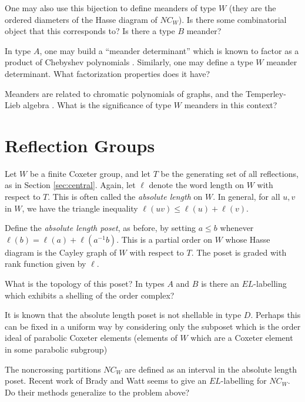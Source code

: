 \documentclass[12pt,letterpaper, reqno]{aimpl}
\begin{document}
\begin{problemblock}



\begin{problem}[2.6]
One may also use this bijection to define meanders of type $W$ (they are the ordered diameters of the Hasse diagram of $NC_W$). Is there some combinatorial object that this corresponds to? Is there a type $B$ meander?
\end{problem}

\begin{remark}
 In type $A$, one may build a ``meander determinant'' which is known to factor as a product of Chebyshev polynomials \cite{difrancesco}. Similarly, one may define a type $W$ meander determinant. What factorization properties does it have?

Meanders are related to chromatic polynomials of graphs, and the Temperley-Lieb algebra \cite{cautis-jackson}. What is the significance of type $W$ meanders in this context?
\end{remark}

\end{problemblock}

\section{Reflection Groups}

\begin{problemblock} Let $W$ be a finite Coxeter group, and let $T$ be the generating set of all reflections, as in Section \ref{sec:central}. Again, let $\ell$ denote the word length on $W$ with respect to $T$. This is often called the 
\emph{absolute length} on $W$. In general, for all $u,v$ in $W$, we have the triangle inequality $\ell(uv)\leq \ell(u)+\ell(v)$.

Define the \emph{absolute length poset}, as before, by setting $a\leq b$ whenever $\ell(b)=\ell(a)+\ell(a^{-1}b)$. This is a partial order on $W$ whose Hasse diagram is the Cayley graph of $W$ with respect to $T$. The poset is graded with rank function given by $\ell$.

\begin{problem}[3.1] 
What is the topology of this poset? In types $A$ and $B$ is there an $EL$-labelling which exhibits a shelling of the order complex?
\end{problem}

 It is known that the absolute length poset is not shellable in type $D$. Perhaps this can be fixed in a uniform way by considering only the subposet which is the order ideal of parabolic Coxeter elements (elements of $W$ which are a Coxeter element in some parabolic subgroup)

\begin{remark} The noncrossing partitions $NC_W$ are defined as an interval in the absolute length poset. Recent work of Brady and Watt \cite{brady-watt} seems to give an $EL$-labelling for $NC_W$. Do their methods generalize to the problem above?\end{remark}

\end{problemblock}
\end{document}
